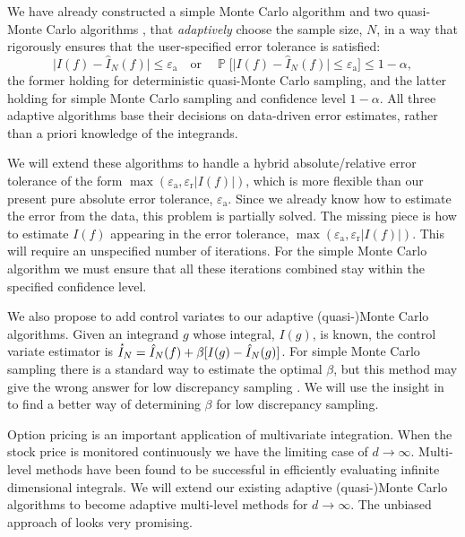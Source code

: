 \documentclass[11pt]{NSFamsart}
\newcommand{\hI}{\hat{I}}
\DeclareMathOperator{\Prob}{\mathbb{P}}
\def\abs#1{\ensuremath{\left \lvert #1 \right \rvert}}
\newcommand{\bigabs}[1]{\ensuremath{\bigl \lvert #1 \bigr \rvert}}
\newcommand{\abstol}{\varepsilon_{\text{a}}}
\newcommand{\reltol}{\varepsilon_{\text{r}}}
\newcommand\starred[1]{\accentset{\star}{#1}}
\begin{document}
We have already constructed a simple Monte Carlo algorithm \citep{HicEtal14b} and two quasi-Monte Carlo algorithms \citep{HicJim16a,JimHic16a}, that \emph{adaptively} choose the sample size, $N$, in a way that rigorously ensures that the user-specified error tolerance is satisfied:
\begin{equation} \label{cubMCguar}
\bigabs{I(f) -\hI_N(f)} \le \abstol \quad \text{or} \quad \Prob\bigl[\bigabs{I(f) -\hI_N(f)} \le \abstol \bigr] \le 1-\alpha,
\end{equation}
the former holding for deterministic quasi-Monte Carlo sampling, and the latter holding for simple Monte Carlo sampling and confidence level $1-\alpha$.  All three adaptive algorithms base their decisions on data-driven error estimates, rather than a priori knowledge of the integrands.

We will extend these algorithms to handle a hybrid absolute/relative error tolerance of the form $\max(\abstol,\reltol \abs{I(f)})$, which is more flexible than our present pure absolute error tolerance, $\abstol$.  Since we already know how to estimate the error from the data, this problem is partially solved.  The missing piece is how to estimate $I(f)$ appearing in the error tolerance, $\max(\abstol,\reltol \abs{I(f)})$.  This will require an unspecified number of iterations.  For the simple Monte Carlo algorithm we must ensure that all these iterations combined stay within the specified confidence level.

We also propose to add control variates to our adaptive (quasi-)Monte Carlo algorithms.  Given an integrand $g$ whose integral, $I(g)$, is known, the control variate estimator is $\starred{I}_{N}=\hI_N(f) + \beta [ I(g) - \hI_N(g)]$.  For simple Monte Carlo sampling there is a standard way to estimate the optimal $\beta$, but this method may give the wrong answer for low discrepancy sampling \citep{HicEtal03}.  We will use the insight in \citep{HicEtal03} to find a better way of determining $\beta$ for low discrepancy sampling.

Option pricing is an important application of multivariate integration.  When the stock price is monitored continuously we have the  limiting case of $d\to \infty$.  Multi-level methods \citep{Gil14a,Hei01a,HicMGRitNiu09a,NiuHic09b} have been found to be successful in efficiently evaluating infinite dimensional integrals.  We will extend our existing adaptive (quasi-)Monte Carlo algorithms to become adaptive multi-level methods for $d \to \infty$.  The unbiased approach of \cite{RheGly12a} looks very promising.
\end{document}
